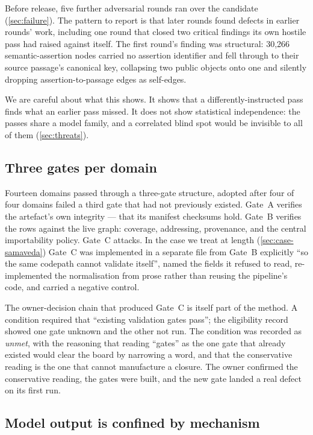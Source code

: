 Before release, five further adversarial rounds ran over the candidate
(\cref{sec:failure}). The pattern to report is that later rounds found defects in
earlier rounds' work, including one round that closed two critical findings its own
hostile pass had raised against itself. The first round's finding was structural:
30{,}266 semantic-assertion nodes carried no assertion identifier and fell through to
their source passage's canonical key, collapsing two public objects onto one and
silently dropping assertion-to-passage edges as self-edges.

We are careful about what this shows. It shows that a differently-instructed pass
finds what an earlier pass missed. It does not show statistical independence: the
passes share a model family, and a correlated blind spot would be invisible to all
of them (\cref{sec:threats}).

\subsection{Three gates per domain}
\label{sec:gates}

Fourteen domains passed through a three-gate structure, adopted after four of four
domains failed a third gate that had not previously existed. Gate~A verifies the
artefact's own integrity --- that its manifest checksums hold. Gate~B verifies the
rows against the live graph: coverage, addressing, provenance, and the central
importability policy. Gate~C attacks. In the case we treat at length
(\cref{sec:case-samaveda}) Gate~C was implemented in a separate file from Gate~B
explicitly ``so the same codepath cannot validate itself'', named the fields it
refused to read, re-implemented the normalisation from prose rather than reusing the
pipeline's code, and carried a negative control.

The owner-decision chain that produced Gate~C is itself part of the method. A
condition required that ``existing validation gates pass''; the eligibility record
showed one gate unknown and the other not run. The condition was recorded as
\emph{unmet}, with the reasoning that reading ``gates'' as the one gate that already
existed would clear the board by narrowing a word, and that the conservative reading
is the one that cannot manufacture a closure. The owner confirmed the conservative
reading, the gates were built, and the new gate landed a real defect on its first
run.

\subsection{Model output is confined by mechanism}
\label{sec:mechanism}


